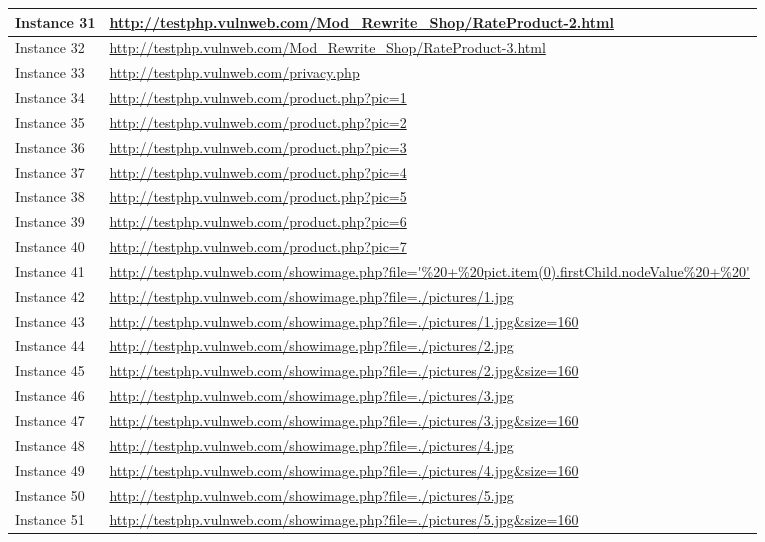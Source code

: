 \documentclass[12pt]{article}
\begin{document}
\begin{center}
\begin{longtable}{|l|p{10cm}|}
Instance 31 & \url{http://testphp.vulnweb.com/Mod\_Rewrite\_Shop/RateProduct-2.html} \\
\hline
Instance 32 & \url{http://testphp.vulnweb.com/Mod\_Rewrite\_Shop/RateProduct-3.html} \\
\hline
Instance 33 & \url{http://testphp.vulnweb.com/privacy.php} \\
\hline
Instance 34 & \url{http://testphp.vulnweb.com/product.php?pic=1} \\
\hline
Instance 35 & \url{http://testphp.vulnweb.com/product.php?pic=2} \\
\hline
Instance 36 & \url{http://testphp.vulnweb.com/product.php?pic=3} \\
\hline
Instance 37 & \url{http://testphp.vulnweb.com/product.php?pic=4} \\
\hline
Instance 38 & \url{http://testphp.vulnweb.com/product.php?pic=5} \\
\hline
Instance 39 & \url{http://testphp.vulnweb.com/product.php?pic=6} \\
\hline
Instance 40 & \url{http://testphp.vulnweb.com/product.php?pic=7} \\
\hline
Instance 41 & \url{http://testphp.vulnweb.com/showimage.php?file='\%20+\%20pict.item(0).firstChild.nodeValue\%20+\%20'} \\
\hline
Instance 42 & \url{http://testphp.vulnweb.com/showimage.php?file=./pictures/1.jpg} \\
\hline
Instance 43 & \url{http://testphp.vulnweb.com/showimage.php?file=./pictures/1.jpg\&size=160} \\
\hline
Instance 44 & \url{http://testphp.vulnweb.com/showimage.php?file=./pictures/2.jpg} \\
\hline
Instance 45 & \url{http://testphp.vulnweb.com/showimage.php?file=./pictures/2.jpg\&size=160} \\
\hline
Instance 46 & \url{http://testphp.vulnweb.com/showimage.php?file=./pictures/3.jpg} \\
\hline
Instance 47 & \url{http://testphp.vulnweb.com/showimage.php?file=./pictures/3.jpg\&size=160} \\
\hline
Instance 48 & \url{http://testphp.vulnweb.com/showimage.php?file=./pictures/4.jpg} \\
\hline
Instance 49 & \url{http://testphp.vulnweb.com/showimage.php?file=./pictures/4.jpg\&size=160} \\
\hline
Instance 50 & \url{http://testphp.vulnweb.com/showimage.php?file=./pictures/5.jpg} \\
\hline
Instance 51 & \url{http://testphp.vulnweb.com/showimage.php?file=./pictures/5.jpg\&size=160} \\

\end{longtable}
\end{center}
\end{document}
